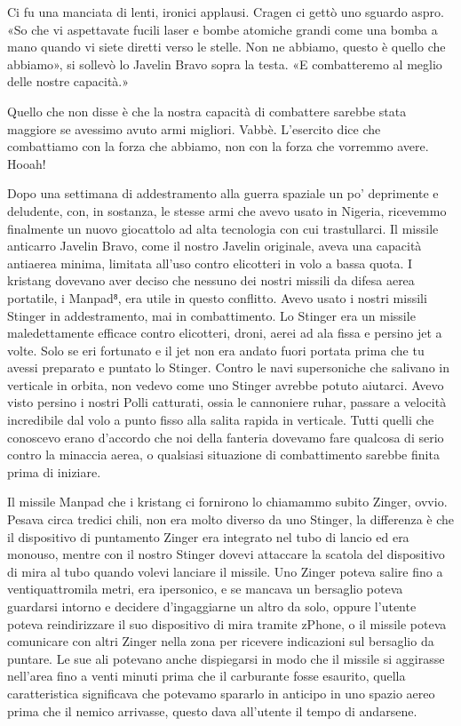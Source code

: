 Ci fu una manciata di lenti, ironici applausi. Cragen ci gettò uno
sguardo aspro. «So che vi aspettavate fucili laser e bombe atomiche
grandi come una bomba a mano quando vi siete diretti verso le stelle.
Non ne abbiamo, questo è quello che abbiamo», si sollevò lo Javelin
Bravo sopra la testa. «E combatteremo al meglio delle nostre capacità.»

Quello che non disse è che la nostra capacità di combattere sarebbe
stata maggiore se avessimo avuto armi migliori. Vabbè. L'esercito dice
che combattiamo con la forza che abbiamo, non con la forza che vorremmo
avere. Hooah!

\hfill\break

Dopo una settimana di addestramento alla guerra spaziale un po'
deprimente e deludente, con, in sostanza, le stesse armi che avevo usato
in Nigeria, ricevemmo finalmente un nuovo giocattolo ad alta tecnologia
con cui trastullarci. Il missile anticarro Javelin Bravo, come il nostro
Javelin originale, aveva una capacità antiaerea minima, limitata all'uso
contro elicotteri in volo a bassa quota. I kristang dovevano aver deciso
che nessuno dei nostri missili da difesa aerea portatile, i Manpad⁸, era
utile in questo conflitto. Avevo usato i nostri missili Stinger in
addestramento, mai in combattimento. Lo Stinger era un missile
maledettamente efficace contro elicotteri, droni, aerei ad ala fissa e
persino jet a volte. Solo se eri fortunato e il jet non era andato fuori
portata prima che tu avessi preparato e puntato lo Stinger. Contro le
navi supersoniche che salivano in verticale in orbita, non vedevo come
uno Stinger avrebbe potuto aiutarci. Avevo visto persino i nostri Polli
catturati, ossia le cannoniere ruhar, passare a velocità incredibile dal
volo a punto fisso alla salita rapida in verticale. Tutti quelli che
conoscevo erano d'accordo che noi della fanteria dovevamo fare qualcosa
di serio contro la minaccia aerea, o qualsiasi situazione di
combattimento sarebbe finita prima di iniziare.

Il missile Manpad che i kristang ci fornirono lo chiamammo subito
Zinger, ovvio. Pesava circa tredici chili, non era molto diverso da uno
Stinger, la differenza è che il dispositivo di puntamento Zinger era
integrato nel tubo di lancio ed era monouso, mentre con il nostro
Stinger dovevi attaccare la scatola del dispositivo di mira al tubo
quando volevi lanciare il missile. Uno Zinger poteva salire fino a
ventiquattromila metri, era ipersonico, e se mancava un bersaglio poteva
guardarsi intorno e decidere d'ingaggiarne un altro da solo, oppure
l'utente poteva reindirizzare il suo dispositivo di mira tramite zPhone,
o il missile poteva comunicare con altri Zinger nella zona per ricevere
indicazioni sul bersaglio da puntare. Le sue ali potevano anche
dispiegarsi in modo che il missile si aggirasse nell'area fino a venti
minuti prima che il carburante fosse esaurito, quella caratteristica
significava che potevamo spararlo in anticipo in uno spazio aereo prima
che il nemico arrivasse, questo dava all'utente il tempo di andarsene.

